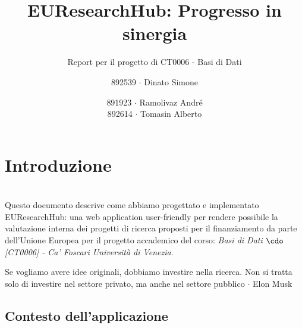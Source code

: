 \documentclass{report}
\author{892539 $\cdot$ Dinato Simone}
\date{891923 $\cdot$ Ramolivaz André \\892614 $\cdot$ Tomasin Alberto}
\title{EUResearchHub: Progresso in sinergia}
\subtitle{Report per il progetto di CT0006 - Basi di Dati}
\begin{document}
	
\imtaMaketitlepage

\tableofcontents

\newpage




\chapter{Introduzione}

\phantom{This text will be invisible}\\
Questo documento descrive come abbiamo progettato e implementato EUResearchHub: una web application user-friendly per rendere possibile la valutazione interna dei progetti di ricerca proposti per il finanziamento da parte dell'Unione Europea per il progetto accademico del corso:\textit{ Basi di Dati $\cdo$ [CT0006] - Ca' Foscari Università di Venezia}.
\begin{imtaQuote}
Se vogliamo avere idee originali, dobbiamo investire nella ricerca. Non si tratta solo di investire nel settore privato, ma anche nel settore pubblico  $\cdot$ Elon Musk \end{imtaQuote}


\section{Contesto dell'applicazione}
\end{document}
